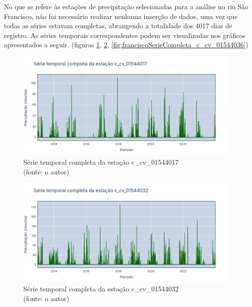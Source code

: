 No que se refere às estações de precipitação selecionadas para a análise no rio São Francisco, não foi necessário realizar nenhuma inserção de dados, uma vez que todas as séries estavam completas, abrangendo a totalidade dos 4017 dias de registro. As séries temporais correspondentes podem ser visualizadas nos gráficos apresentados a seguir. (figuras \ref{fig:franciscoSerieCompleta_c_cv_01544017}, \ref{fig:franciscoSerieCompleta_c_cv_01544032}, \ref{fig:franciscoSerieCompleta_c_cv_01544036})

\begin{figure}[!h]
	\centering
	\includegraphics[scale=0.25]{Figuras/rio_sao_francisco/franciscoSerieCompleta_c_cv_01544017.png}
	\caption{Série temporal completa da estação c\_cv\_01544017\\(fonte: o autor)}
	\label{fig:franciscoSerieCompleta_c_cv_01544017}
\end{figure}

\begin{figure}[!h]
	\centering
	\includegraphics[scale=0.25]{Figuras/rio_sao_francisco/franciscoSerieCompleta_c_cv_01544032.png}
	\caption{Série temporal completa da estação c\_cv\_01544032\\(fonte: o autor)}
	\label{fig:franciscoSerieCompleta_c_cv_01544032}
\end{figure}

